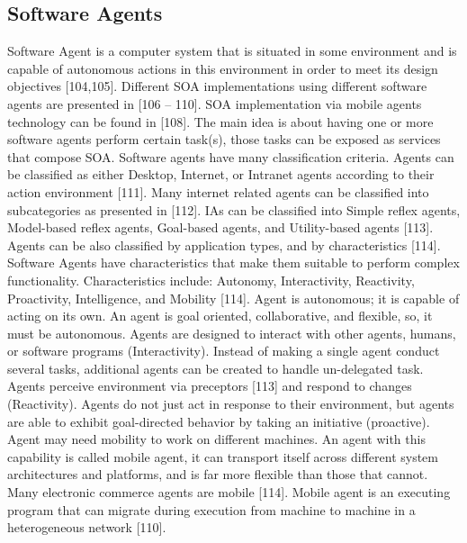 \documentclass[12pt,a4paper,final,twoside,onecolumn,titlepage]{book}
\begin{document}
\subsection{Software Agents}
Software Agent is a computer system that is situated in some environment and is capable of autonomous actions in this environment in order to meet its design objectives [104,105]. 
Different \gls{SOA} implementations using different software agents are presented in [106 – 110]. \gls{SOA} implementation via mobile agents technology can be found in [108]. The main idea is about having one or more software agents perform certain task(s), those tasks can be exposed as services that compose \gls{SOA}.
Software agents have many classification criteria. Agents can be classified as either Desktop, Internet, or Intranet agents according to their action environment [111]. Many internet related agents can be classified into subcategories as presented in [112]. \gls{IA}s can be classified into Simple reflex agents, Model-based reflex agents, Goal-based agents, and Utility-based agents [113]. Agents can be also classified by application types, and by characteristics [114]. 
Software Agents have characteristics that make them suitable to perform complex functionality. Characteristics include: Autonomy, Interactivity, Reactivity, Proactivity, Intelligence, and Mobility [114]. Agent is autonomous; it is capable of acting on its own. An agent is goal oriented, collaborative, and flexible, so, it must be autonomous. Agents are designed to interact with other agents, humans, or software programs (Interactivity). Instead of making a single agent conduct several tasks, additional agents can be created to handle un-delegated task. Agents perceive environment via preceptors [113] and respond to changes (Reactivity). Agents do not just act in response to their environment, but agents are able to exhibit goal-directed behavior by taking an initiative (proactive). Agent may need mobility to work on different machines. An agent with this capability is called mobile agent, it can transport itself across different system architectures and platforms, and is far more flexible than those that cannot. Many electronic commerce agents are mobile [114]. Mobile agent is an executing program that can migrate during execution from machine to machine in a heterogeneous network [110].
\end{document}
